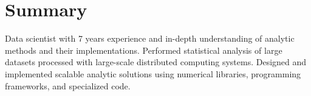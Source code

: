 \documentclass{myfancycv}
\begin{document}
\makeheader
\vspace*{-.35em}

  \vspace*{-0.5em}
\section{Summary}

Data scientist with 7 years experience and in-depth understanding of analytic methods and their implementations.
Performed statistical analysis of large datasets processed with large-scale distributed computing systems.
Designed and implemented scalable analytic solutions using numerical libraries, programming frameworks, and specialized code.

\end{document}
